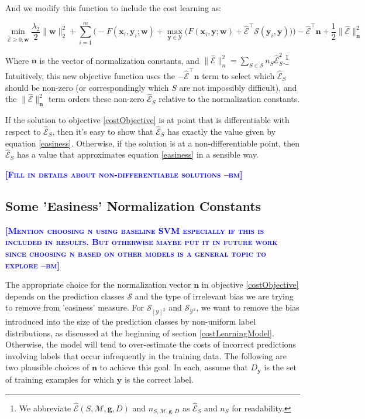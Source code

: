 \documentclass{article} %
\newcommand{\bmcomment}[1]{\textcolor{blue}{\textsc{\textbf{[#1 --bm]}}}}
\begin{document}
And we modify this function to include the cost learning as:

\begin{equation}
\label{costObjective}
\min_{\mathbf{\mathcal{\hat{E}}}\geq 0,\mathbf{w}} \frac{\lambda_2}{2}\|\mathbf{w}\|_2^2 + \sum_{i=1}^m\bigg(-F(\mathbf{x}_i,\mathbf{y}_i;\mathbf{w})+\max_{\mathbf{y}\in \mathcal{Y}}\Big(F(\mathbf{x}_i,\mathbf{y};\mathbf{w})+\mathbf{\mathcal{\hat{E}}}^\top \mathbf{\mathcal{S}}(\mathbf{y}_i,\mathbf{y})\Big)\bigg)-\mathbf{\mathcal{\hat{E}}}^\top\mathbf{n}+\frac{1}{2}\|\mathbf{\mathcal{\hat{E}}}\|^2_\mathbf{n}
\end{equation}

Where $\mathbf{n}$ is the vector of normalization constants, and 
$\|\mathbf{\mathcal{\hat{E}}}\|^2_n=\sum_{S\in\mathcal{S}}n_S\mathcal{\hat{E}}_S^2$.\footnote{
  We abbreviate $\mathcal{\hat{E}}(S,\mathcal{M},\mathbf{g},D)$ and 
 $n_{S,\mathcal{M},\mathbf{g},D}$ as $\mathcal{\hat{E}}_S$ and $n_S$ for 
 readability.
}
Intuitively, this new objective function uses the 
$-\mathbf{\mathcal{\hat{E}}}^\top\mathbf{n}$ term to select which 
$\mathcal{\hat{E}}_S$
should be non-zero (or correspondingly which $S$ are not 
impossibly difficult), and the $\|\mathcal{\hat{E}}\|^2_\mathbf{n}$ term orders
these non-zero $\mathcal{\hat{E}}_S$ relative to 
the normalization constants.

If the solution to objective \ref{costObjective} is at point that is 
differentiable with respect to $\mathcal{\hat{E}}_S$, then it's easy to 
show that $\mathcal{\hat{E}}_S$ has exactly the value given by 
equation \ref{easiness}.
Otherwise, if the solution is at a non-differentiable point, then 
$\mathcal{\hat{E}}_S$ has a value that approximates equation \ref{easiness}
in a sensible way.  

\bmcomment{Fill in details about non-differentiable solutions}

\subsection{Some 'Easiness' Normalization Constants}

\bmcomment{Mention choosing n using baseline 
SVM especially if this is included in results.  But otherwise
maybe put it in future work since choosing n based on other
models is a general topic to explore}

The appropriate choice for the normalization vector $\mathbf{n}$ in 
objective \ref{costObjective} depends on the prediction classes
$\mathcal{S}$ and the type of irrelevant bias we are trying to
remove from 'easiness' measure. For $\mathcal{S}_{[\mathcal{Y}]^2}$
and $\mathcal{S}_{\mathcal{Y}^2}$, we want to remove the bias introduced
into the size of the prediction classes by non-uniform label 
distributions, as discussed at the beginning of section
\ref{costLearningModel}.  Otherwise, the model will tend to over-estimate
the costs of incorrect predictions involving labels that occur 
infrequently in the training data.  The following are two 
plausible choices of $\mathbf{n}$ to achieve this goal. In each,
assume that $D_\mathbf{y}$ is the set of training examples
for which $\mathbf{y}$ is the correct label.
\end{document}
